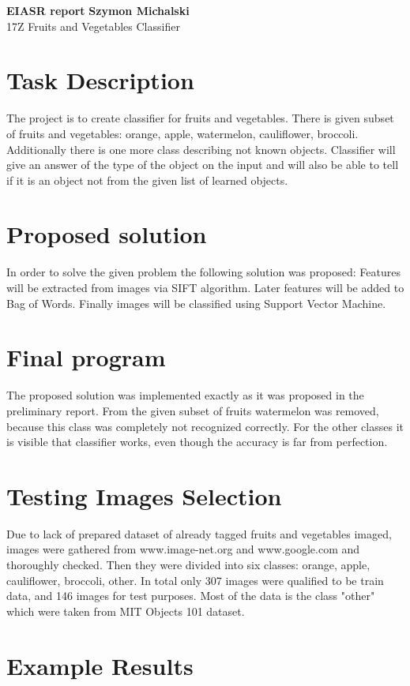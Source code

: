 \documentclass[a4paper, 11pt]{article}
\begin{document}
\noindent
\large\textbf{EIASR report} \hfill \textbf{Szymon Michalski} \\
\normalsize 17Z \hfill Fruits and Vegetables Classifier\\


\section*{Task Description}
The project is to create classifier for fruits and vegetables. 
There is given subset of fruits and vegetables: orange, apple, watermelon, cauliflower, broccoli. Additionally there is one more class describing not known objects.
Classifier will give an answer of the type of the object on the input and will also be able to tell if it is an object not from the given list of learned objects.

\section*{Proposed solution}
In order to solve the given problem the following solution was proposed:
Features will be extracted from images via SIFT algorithm. Later features will be added to Bag of Words. Finally images will be classified using Support Vector Machine.

\section*{Final program}
The proposed solution was implemented exactly as it was proposed in the preliminary report. From the given subset of fruits watermelon was removed, because this class was completely not recognized correctly. For the other classes it is visible that classifier works, even though the accuracy is far from perfection.

\section*{Testing Images Selection}
Due to lack of prepared dataset of already tagged fruits and vegetables imaged, images were gathered from www.image-net.org and www.google.com and thoroughly checked. Then they were divided into six classes: orange, apple, cauliflower, broccoli, other. In total only 307 images were qualified to be train data, and 146 images for test purposes. Most of the data is the class "other" which were taken from MIT Objects 101 dataset.

\section*{Example Results}
\end{document}
